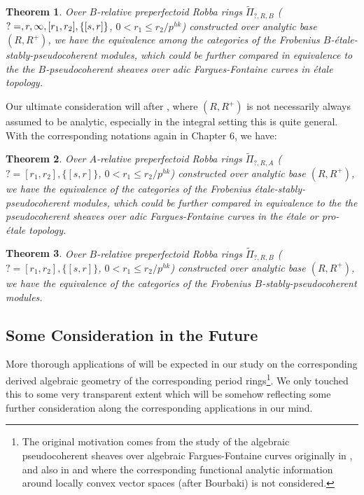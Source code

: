\documentclass[12pt]{amsart}
\newtheorem{theorem}{Theorem}[section]
\theoremstyle{definition}
\numberwithin{equation}{section}
\begin{document}
\begin{theorem}
Over $B$-relative preperfectoid Robba rings $\widetilde{\Pi}_{?,R,B}$ ($?=\empty,r,\infty,[r_1,r_2],\{[s,r]\}$, $0<r_1\leq r_2/p^{hk}$) constructed over analytic base $(R,R^+)$, we have the equivalence among the categories of the Frobenius $B$-\'etale-stably-pseudocoherent modules, which could be further compared in equivalence to the the $B$-pseudocoherent sheaves over adic Fargues-Fontaine curves in \'etale topology.	
\end{theorem}



\indent Our ultimate consideration will after \cite{GR}, where $(R,R^+)$ is not necessarily always assumed to be analytic, especially in the integral setting this is quite general. With the corresponding notations again in Chapter 6, we have:


\begin{theorem}
Over $A$-relative preperfectoid Robba rings $\widetilde{\Pi}_{?,R,A}$ ($?=[r_1,r_2],\{[s,r]\}$, $0<r_1\leq r_2/p^{hk}$) constructed over analytic base $(R,R^+)$, we have the equivalence of the categories of the Frobenius \'etale-stably-pseudocoherent modules, which could be further compared in equivalence to the the pseudocoherent sheaves over adic Fargues-Fontaine curves in the \'etale or pro-\'etale topology.	
\end{theorem}


\begin{theorem}
Over $B$-relative preperfectoid Robba rings $\widetilde{\Pi}_{?,R,B}$ ($?=[r_1,r_2],\{[s,r]\}$, $0<r_1\leq r_2/p^{hk}$) constructed over analytic base $(R,R^+)$, we have the equivalence of the categories of the Frobenius $B$-stably-pseudocoherent modules.	
\end{theorem}




\subsection{Some Consideration in the Future}


More thorough applications of \cite{Lu2} will be expected in our study on the corresponding derived algebraic geometry of the corresponding period rings\footnote{The original motivation comes from the study of the algebraic pseudocoherent sheaves over algebraic Fargues-Fontaine curves originally in \cite{KL2}, and also in \cite{XT1} and \cite{XT2} where the corresponding functional analytic information around locally convex vector spaces (after Bourbaki) is not considered.}. We only touched this to some very transparent extent which will be somehow reflecting some further consideration along the corresponding applications in our mind.\\
\end{document}

